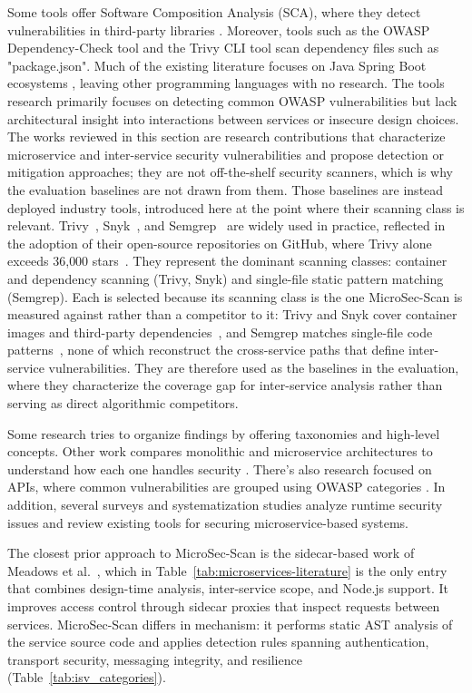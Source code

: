\documentclass[preprint,12pt]{elsarticle}
\newcommand{\new}[1]{#1}
\begin{document}
Some tools offer Software Composition Analysis (SCA), where they detect vulnerabilities in third-party libraries \cite{ali2024sca}. Moreover, tools such as the OWASP Dependency-Check tool and the Trivy CLI tool scan dependency files such as "package.json". Much of the existing literature focuses on Java Spring Boot ecosystems \cite{abdurrahman2024securemarketplace}, leaving other programming languages with no research. The tools research primarily focuses on detecting common OWASP vulnerabilities but lack architectural insight into interactions between services or insecure design choices. \new{The works reviewed in this section are research contributions that
characterize microservice and inter-service security vulnerabilities and
propose detection or mitigation approaches; they are not off-the-shelf
security scanners, which is why the evaluation baselines are not drawn from
them. Those baselines are instead deployed industry tools, introduced here
at the point where their scanning class is relevant. Trivy~\cite{trivy},
Snyk~\cite{snyk}, and Semgrep~\cite{semgrep} are widely used in practice,
reflected in the adoption of their open-source repositories on GitHub, where
Trivy alone exceeds 36{,}000 stars~\cite{trivy_repo}. They represent the
dominant scanning classes: container and dependency scanning (Trivy, Snyk)
and single-file static pattern matching (Semgrep). Each is
selected because its scanning class is the one MicroSec-Scan is measured
against rather than a competitor to it: Trivy and Snyk cover container
images and third-party dependencies~\cite{trivy,snyk}, and Semgrep matches
single-file code patterns~\cite{semgrep}, none of which reconstruct the
cross-service paths that define inter-service vulnerabilities. They are
therefore used as the baselines in the evaluation, where they characterize
the coverage gap for inter-service analysis rather than serving as direct
algorithmic competitors.}

Some research tries to organize findings by offering taxonomies and high-level concepts. Other work compares monolithic and microservice architectures to understand how each one handles security \cite{nemmini2023fortifying}. There’s also research focused on APIs, where common vulnerabilities are grouped using OWASP categories \cite{nawrocki2024vulnerabilities}. In addition, several surveys and systematization studies analyze runtime security issues and review existing tools for securing microservice-based systems\cite{minna2023runtime,haindl2024systematic,gorige2020privacy}.

\new{The closest prior approach to MicroSec-Scan is the sidecar-based work of Meadows et al.~\cite{meadows2023sidecar}, which in Table~\ref{tab:microservices-literature} is the only entry that combines design-time analysis, inter-service scope, and Node.js support. It improves access control through sidecar proxies that inspect requests between services. MicroSec-Scan differs in mechanism: it performs static AST analysis of the service source code and applies detection rules spanning authentication, transport security, messaging integrity, and resilience (Table~\ref{tab:isv_categories}).}
\end{document}
